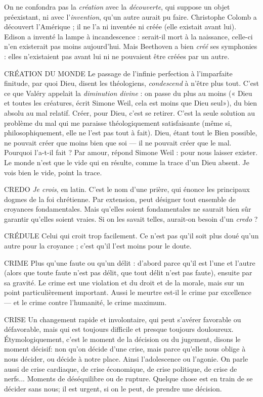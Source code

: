 On ne confondra pas la {\it création} avec la {\it découverte}, qui suppose un objet
préexistant, ni avec l'{\it invention}, qu’un autre aurait pu faire. Christophe Colomb a
découvert l'Amérique ; il ne l’a ni inventée ni créée (elle existait avant lui). Edison
a inventé la lampe à incandescence : serait-il mort à la naissance, celle-ci n’en existerait
pas moins aujourd’hui. Mais Beethoven a bien {\it créé} ses symphonies : elles
n’existaient pas avant lui ni ne pouvaient être créées par un autre.

CRÉATION DU MONDE  Le passage de l’infinie perfection à l’imparfaite
finitude, par quoi Dieu, disent les théologiens,
{\it condescend} à n'être plus tout. C’est ce que Valéry appelait la {\it diminution divine} :
on passe du plus au moins (« Dieu et toutes les créatures, écrit Simone Weil,
cela est moins que Dieu seul»), du bien absolu au mal relatif. Créer, pour
Dieu, c’est se retirer. C’est la seule solution au problème du mal qui me
paraisse théologiquement satisfaisante (même si, philosophiquement, elle ne
l’est pas tout à fait). Dieu, étant tout le Bien possible, ne pouvait créer que
moins bien que soi — il ne pouvait créer que le mal. Pourquoi l’a-t-il fait ? Par
amour, répond Simone Weil : pour nous laisser exister. Le monde n’est que le
vide qui en résulte, comme la trace d’un Dieu absent.
Je vois bien le vide, point la trace.

CREDO {\it Je crois}, en latin. C’est le nom d’une prière, qui énonce les principaux
dogmes de la foi chrétienne. Par extension, peut désigner tout
ensemble de croyances fondamentales. Mais qu’elles soient fondamentales ne
saurait bien sûr garantir qu’elles soient vraies. Si on les savait telles, aurait-on
besoin d’un {\it credo} ?

CRÉDULE Celui qui croit trop facilement. Ce n’est pas qu’il soit plus doué
qu’un autre pour la croyance ; c’est qu’il l’est moins pour le
doute.

CRIME Plus qu’une faute ou qu’un délit : d’abord parce qu’il est l’une et
l’autre (alors que toute faute n’est pas délit, que tout délit n’est pas
faute), ensuite par sa gravité. Le crime est une violation et du droit et de la
morale, mais sur un point particulièrement important. Aussi le meurtre est-il le
crime par excellence — et le crime contre l’humanité, le crime maximum.

CRISE Un changement rapide et involontaire, qui peut s’avérer favorable
ou défavorable, mais qui est toujours difficile et presque toujours
douloureux. Étymologiquement, c’est le moment de la décision ou du jugement,
disons le moment décisif: non qu’on décide d’une crise, mais parce
qu’elle nous oblige à nous décider, ou décide à notre place. Ainsi l'adolescence
ou l’agonie. On parle aussi de crise cardiaque, de crise économique, de crise
politique, de crise de nerfs... Moments de déséquilibre ou de rupture. Quelque
chose est en train de se décider sans nous; il est urgent, si on le peut, de
prendre une décision.

